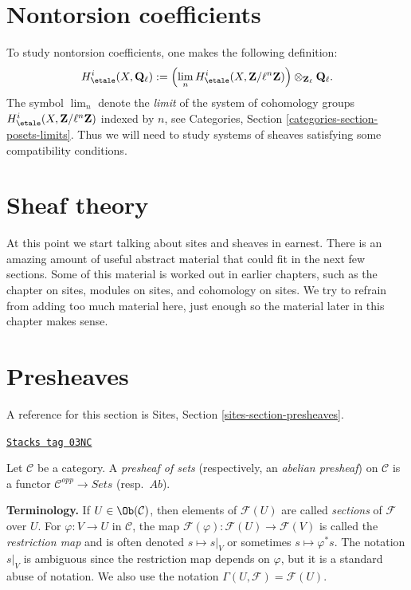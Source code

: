 \section{Nontorsion coefficients}
\label{etale-cohomology-section-nontorsion}
To study nontorsion coefficients, one makes the following definition:
$$
H_\etale^i (X, \mathbf{Q}_\ell) :=
\left( \lim_n H_\etale^i(X, \mathbf{Z}/\ell^n\mathbf{Z}) \right)
\otimes_{\mathbf{Z}_\ell} \mathbf{Q}_\ell.
$$
The symbol $\lim_n$ denote the {\it limit} of the system of
cohomology groups $H_\etale^i(X, \mathbf{Z}/\ell^n\mathbf{Z})$ indexed
by $n$, see
Categories, Section \ref{categories-section-posets-limits}.
Thus we will need to study systems of sheaves satisfying some compatibility
conditions.

\section{Sheaf theory}
\label{etale-cohomology-section-sheaf-theory}

At this point we start talking about sites and sheaves in earnest.
There is an amazing amount of useful abstract material that could fit
in the next few sections. Some of this material is worked out in earlier
chapters, such as the chapter on sites, modules on sites, and cohomology
on sites. We try to refrain from adding too much material here, just
enough so the material later in this chapter makes sense.

\section{Presheaves}
\label{etale-cohomology-section-presheaves}
A reference for this section is
Sites, Section \ref{sites-section-presheaves}.

\begin{definition}[Presheaf]
\label{etale-cohomology-definition-presheaf}
\href{https://stacks.math.columbia.edu/tag/03NC}{\texttt{Stacks tag 03NC}}

Let $\mathcal{C}$ be a category. A {\it presheaf of sets} (respectively, an
{\it abelian presheaf}) on $\mathcal{C}$ is a functor $\mathcal{C}^{opp} \to
\textit{Sets}$ (resp.\ $\textit{Ab}$).
\end{definition}

{\bf Terminology.} If $U \in \Ob(\mathcal{C})$, then elements of
$\mathcal{F}(U)$ are called {\it sections} of $\mathcal{F}$ over
$U$. For $\varphi : V \to U$ in $\mathcal{C}$, the
map $\mathcal{F}(\varphi) : \mathcal{F}(U) \to \mathcal{F}(V)$
is called the {\it restriction map} and is often denoted $s \mapsto s|_V$
or sometimes $s \mapsto \varphi^*s$. The notation $s|_V$ is ambiguous
since the restriction map depends on $\varphi$, but it is a standard
abuse of notation. We also use the notation
$\Gamma(U, \mathcal{F}) = \mathcal{F}(U)$.

